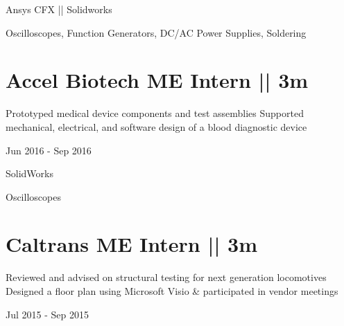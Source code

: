 \vspace{-1.5ex}
{
\vspace{1.8ex}
\color{cyan}\small
{Ansys CFX || Solidworks} %
}

{
\vspace{-0.3ex}
\color{cyan}\small
{Oscilloscopes, Function Generators, DC/AC Power Supplies, Soldering} %
}
\vspace{-1.5ex}


\section
{\textbf{Accel Biotech}
\newline
ME Intern || 3m}

\BulletItem
\vspace{-2.5ex}
\begin{detail}
\BulletItem
Prototyped medical device components and test assemblies
\BulletItem
Supported mechanical, electrical, and software design of a blood diagnostic device
\end{detail}

\begin{subtitle}
\vspace{-7.8ex}
{{Jun 2016 - Sep 2016}}
\end{subtitle}
\vspace{0ex}

{
\vspace{0.5ex}
\color{cyan}\small
{SolidWorks} %
}

{
\vspace{-2.5ex}\hspace{3.17in}
\color{cyan}\small
{Oscilloscopes} %
}
\vspace{-1.5ex}



\section
{\textbf{Caltrans}
\newline
ME Intern || 3m
\newline
}

\BulletItem
\vspace{-2.5ex}
\begin{detail}
\BulletItem
Reviewed and advised on structural testing for next generation locomotives
\BulletItem
Designed a floor plan using Microsoft Visio \& participated in vendor meetings
\end{detail}

\begin{subtitle}
\vspace{-7.8ex}
{{Jul 2015 - Sep 2015}}
\end{subtitle}
\vspace{3ex}




